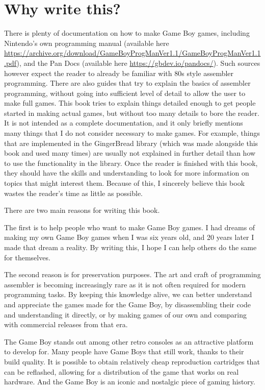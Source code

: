 \documentclass[11pt]{book}
\begin{document}
\section{Why write this?}
There is plenty of documentation on how to make Game Boy games, including Nintendo's own programming manual (available here \url{https://archive.org/download/GameBoyProgManVer1.1/GameBoyProgManVer1.1.pdf}), and the Pan Docs (available here \url{https://gbdev.io/pandocs/}). Such sources however expect the reader to already be familiar with 80s style assembler programming. There are also guides that try to explain the basics of assembler programming, without going into sufficient level of detail to allow the user to make full games. This book tries to explain things detailed enough to get people started in making actual games, but without too many details to bore the reader. It is not intended as a complete documentation, and it only briefly mentions many things that I do not consider necessary to make games. For example, things that are implemented in the GingerBread library (which was made alongside this book and used many times) are usually not explained in further detail than how to use the functionality in the library. Once the reader is finished with this book, they should have the skills and understanding to look for more information on topics that might interest them. Because of this, I sincerely believe this book wastes the reader's time as little as possible.

There are two main reasons for writing this book.

The first is to help people who want to make Game Boy games. I had dreams of making my own Game Boy games when I was six years old, and 20 years later I made that dream a reality. By writing this, I hope I can help others do the same for themselves.

The second reason is for preservation purposes. The art and craft of programming assembler is becoming increasingly rare as it is not often required for modern programming tasks. By keeping this knowledge alive, we can better understand and appreciate the games made for the Game Boy, by disassembling their code and understanding it directly, or by making games of our own and comparing with commercial releases from that era. 

The Game Boy stands out among other retro consoles as an attractive platform to develop for. Many people have Game Boys that still work, thanks to their build quality. It is possible to obtain relatively cheap reproduction cartridges that can be reflashed, allowing for a distribution of the game that works on real hardware. And the Game Boy is an iconic and nostalgic piece of gaming history.
\end{document}
